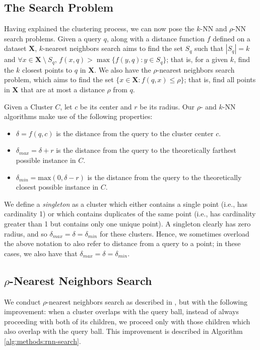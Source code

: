 \subsection{The Search Problem}
\label{subsec:methods:the-search-problem}
Having explained the clustering process, we can now pose the $k$-NN and $\rho$-NN search problems.
Given a query $q$, along with a distance function $f$ defined on a dataset $\textbf{X}$, $k$-nearest neighbors search aims to find 
the set $S_q$ such that  $|S_q| = k$ and $\forall x \in \textbf{X} \ \setminus \ S_q$, $f(x, q) > \max\{f(y, q): y \in S_q \}$;
that is, for a given $k$, find the $k$ closest points to $q$ in $ \textbf{X}$.
We also have the $\rho$-nearest neighbors search problem, which aims to find the set $\{x \in \textbf{X}: f(q, x) \leq \rho \}$;
that is, find all points in $\textbf{X}$ that are at most a distance $\rho$ from $q$.

Given a Cluster $C$, let $c$ be its center and $r$ be its radius. Our $\rho$- and $k$-NN algorithms make use of the following properties:

\begin{itemize}
    \item $\delta = f(q, c)$ is the distance from the query to the cluster center $c$.
    \item $\delta_{max} = \delta + r$ is the distance from the query to the theoretically farthest possible instance in $C$.
    \item $\delta_{min} = \text{max}(0, \delta - r)$ is the distance from the query to the theoretically closest possible instance in $C$.
\end{itemize}

We define a \emph{singleton} as a cluster which either contains a single point (i.e., has cardinality 1) or which contains 
duplicates of the same point (i.e., has cardinality greater than 1 but contains only one unique point).
A singleton clearly has zero radius, and so $\delta_{max} = \delta = \delta_{min}$ for these clusters.
Hence, we sometimes overload the above notation to also refer to distance from a query to a point;
in these cases, we also have that $\delta_{max} = \delta = \delta_{min}$.


\subsection{\texorpdfstring{$\rho$}{p}-Nearest Neighbors Search}
\label{subsec:methods:rnn-search}

We conduct $\rho$-nearest neighbors search as described in \cite{ishaq2019clustered}, but with the following improvement:
when a cluster overlaps with the query ball, instead of  always proceeding with both of its children, we proceed only with those children which also overlap with the query ball.
This improvement is described in Algorithm \ref{alg:methods:rnn-search}.

